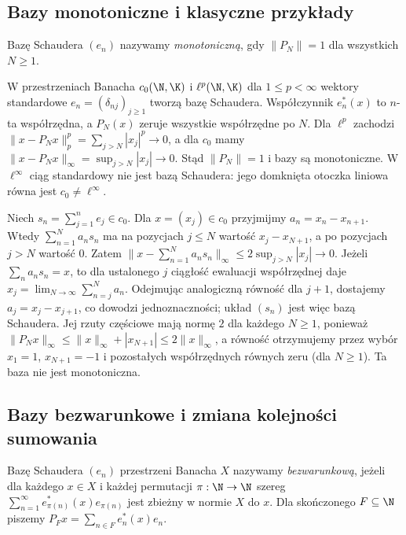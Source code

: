 \subsection{Bazy monotoniczne i klasyczne przykłady}

\begin{definicja}
\label{def:monotonic27}
Bazę Schaudera $(e_n)$ nazywamy \emph{monotoniczną}, gdy
$\|P_N\|=1$ dla wszystkich $N\ge1$.
\end{definicja}

\begin{przyklad}
\label{ex:sequence-bases27}
W przestrzeniach Banacha $c_0(\N,\K)$ i $\ell^p(\N,\K)$
dla $1\le p<\infty$ wektory standardowe
$e_n=(\delta_{nj})_{j\ge1}$ tworzą bazę Schaudera.
Współczynnik $e_n^*(x)$ to $n$-ta współrzędna,
a $P_N(x)$ zeruje wszystkie współrzędne po $N$.
Dla $\ell^p$ zachodzi
$\|x-P_Nx\|_p^p=\sum_{j>N}|x_j|^p\to0$,
a dla $c_0$ mamy $\|x-P_Nx\|_\infty=\sup_{j>N}|x_j|\to0$.
Stąd $\|P_N\|=1$ i bazy są monotoniczne.
W $\ell^\infty$ ciąg standardowy nie jest bazą Schaudera:
jego domknięta otoczka liniowa równa jest $c_0\ne\ell^\infty$.
\end{przyklad}

\begin{przyklad}
\label{ex:summing-basis27}
Niech $s_n=\sum_{j=1}^ne_j\in c_0$.
Dla $x=(x_j)\in c_0$ przyjmijmy $a_n=x_n-x_{n+1}$.
Wtedy $\sum_{n=1}^Na_ns_n$ ma na pozycjach $j\le N$
wartość $x_j-x_{N+1}$, a po pozycjach $j>N$ wartość $0$.
Zatem
$\|x-\sum_{n=1}^Na_ns_n\|_\infty
\le2\sup_{j>N}|x_j|\to0$.
Jeżeli $\sum_na_ns_n=x$, to dla ustalonego $j$ ciągłość
ewaluacji współrzędnej daje $x_j=\lim_{N\to\infty}\sum_{n=j}^Na_n$.
Odejmując analogiczną równość dla $j+1$, dostajemy
$a_j=x_j-x_{j+1}$, co dowodzi jednoznaczności; układ $(s_n)$ jest więc bazą Schaudera.
Jej rzuty częściowe mają normę $2$ dla każdego $N\ge1$,
ponieważ $\|P_Nx\|_\infty
\le\|x\|_\infty+|x_{N+1}|\le2\|x\|_\infty$,
a równość otrzymujemy przez wybór $x_1=1$, $x_{N+1}=-1$
i pozostałych współrzędnych równych zeru (dla $N\ge1$).
Ta baza nie jest monotoniczna.
\end{przyklad}

\subsection{Bazy bezwarunkowe i zmiana kolejności sumowania}

\begin{definicja}
\label{def:unconditional27}
Bazę Schaudera $(e_n)$ przestrzeni Banacha $X$ nazywamy
\emph{bezwarunkową}, jeżeli dla każdego $x\in X$ i każdej
permutacji $\pi:\N\to\N$ szereg
$\sum_{n=1}^\infty e_{\pi(n)}^*(x)e_{\pi(n)}$
jest zbieżny w normie $X$ do $x$.
Dla skończonego $F\subseteq\N$ piszemy
$P_Fx=\sum_{n\in F}e_n^*(x)e_n$.
\end{definicja}

